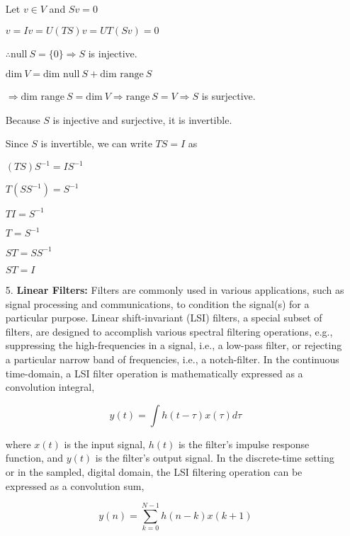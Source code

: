 \documentclass[fleqn]{article}
\begin{document}
\begin{enumerate}[nolistsep]
	Let $v \in V$ and $Sv = 0$
	
	$v = Iv = U(TS)v = UT(Sv) = 0$
	
	$\therefore \text{null}\ S = \{0\} \Rightarrow S$ is injective.
	
	$\text{dim}\ V = \text{dim null}\ S + \text{dim range}\ S$
	
	$\Rightarrow \text{dim range}\ S = \text{dim}\ V \Rightarrow \text{range}\ S = V \Rightarrow S$ is surjective.
	
	Because $S$ is injective and surjective, it is invertible.
	
	Since $S$ is invertible, we can write $TS = I$ as
	
	$(TS)S^{-1} = IS^{-1}$
	
	$T(SS^{-1}) = S^{-1}$
	
	$TI = S^{-1}$
	
	$T = S^{-1}$
	
	$ST = SS^{-1}$
	
	$ST = I$
	
	\item[5.] \textbf{Linear Filters:} Filters are commonly used in various applications, such as signal processing and communications, to condition the signal(s) for a particular purpose. Linear shift-invariant (LSI) filters, a special subset of filters, are designed to accomplish various spectral filtering operations, e.g., suppressing the high-frequencies in a signal, i.e., a low-pass filter, or rejecting a particular narrow band of frequencies, i.e., a notch-filter. In the continuous time-domain, a LSI filter operation is mathematically expressed as a convolution integral,
	
		\begin{equation}
			y(t) = \int{h(t-\tau)x(\tau)d\tau}
		\end{equation}
		
		where $x(t)$ is the input signal, $h(t)$ is the filter’s impulse response function, and $y(t)$ is the filter’s output signal. In the discrete-time setting or in the sampled, digital domain, the LSI filtering operation can be expressed as a convolution sum,
	
		\begin{equation}
			y(n) = \sum_{k=0}^{N-1}{h(n-k)x(k+1)}
			\label{dt_convolution}
		\end{equation}
		
	

\end{enumerate}
\end{document}
